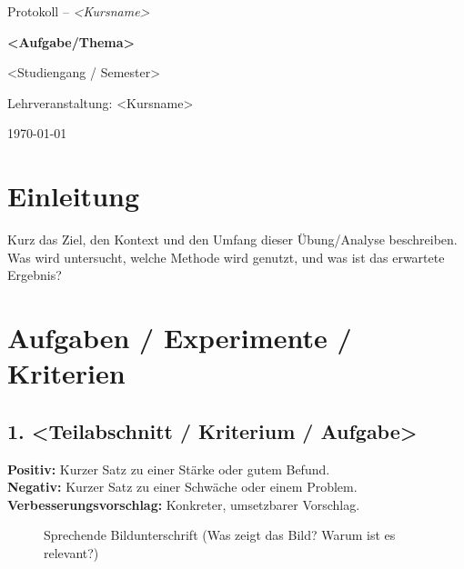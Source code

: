 \documentclass[a4paper,12pt]{article}
\newcommand{\pos}{\textbf{Positiv:} }
\newcommand{\negx}{\textbf{Negativ:} }
\newcommand{\impr}{\textbf{Verbesserungsvorschlag:} }
\begin{document}
\begin{titlepage}
  \centering
  \vspace*{2cm}
  {\Huge Protokoll – \textit{<Kursname>} \par}
  \vspace{0.6cm}
  {\Large \textbf{<Aufgabe/Thema>} \par}
  \vspace{1.6cm}
  { \par}
  {\large <Studiengang / Semester> \par}
  {\large Lehrveranstaltung: <Kursname> \par}
  {\large \today\par}
\end{titlepage}

\section*{Einleitung}
Kurz das Ziel, den Kontext und den Umfang dieser Übung/Analyse beschreiben.
Was wird untersucht, welche Methode wird genutzt, und was ist das erwartete Ergebnis?

\section*{Aufgaben / Experimente / Kriterien}
\subsection*{1. <Teilabschnitt / Kriterium / Aufgabe>}
\pos Kurzer Satz zu einer Stärke oder gutem Befund. \\
\negx Kurzer Satz zu einer Schwäche oder einem Problem. \\
\impr Konkreter, umsetzbarer Vorschlag.

\begin{figure}[H]
  \centering
{}
  \caption{Sprechende Bildunterschrift (Was zeigt das Bild? Warum ist es relevant?)}
\end{figure}
\end{document}
